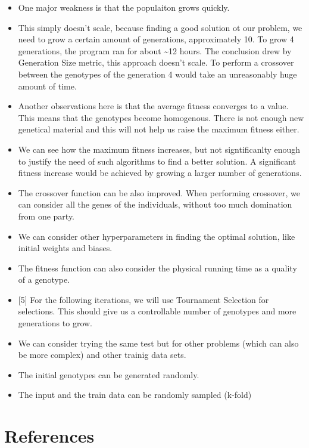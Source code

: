 \documentclass[11pt]{article}
\begin{document}
\begin{itemize}
\item
  One major weakness is that the populaiton grows quickly.
\item
  This simply doesn't scale, because finding a good solution ot our
  problem, we need to grow a certain amount of generations,
  approximately 10. To grow 4 generations, the program ran for about
  \textasciitilde{}12 hours. The conclusion drew by Generation Size
  metric, this approach doesn't scale. To perform a crossover between
  the genotypes of the generation 4 would take an unreasonably huge
  amount of time.
\item
  Another observations here is that the average fitness converges to a
  value. This means that the genotypes become homogenous. There is not
  enough new genetical material and this will not help us raise the
  maximum fitness either.
\item
  We can see how the maximum fitness increases, but not signtificanlty
  enough to justify the need of such algorithms to find a better
  solution. A significant fitness increase would be achieved by growing
  a larger number of generations.
\item
  The crossover function can be also improved. When performing
  crossover, we can consider all the genes of the individuals, without
  too much domination from one party.
\item
  We can consider other hyperparameters in finding the optimal solution,
  like initial weights and biases.
\item
  The fitness function can also consider the physical running time as a
  quality of a genotype.
\item
  {[}5{]} For the following iterations, we will use Tournament Selection
  for selections. This should give us a controllable number of genotypes
  and more generations to grow.
\item
  We can consider trying the same test but for other problems (which can
  also be more complex) and other trainig data sets.
\item
  The initial genotypes can be generated randomly.
\item
  The input and the train data can be randomly sampled (k-fold)
\end{itemize}

    \hypertarget{references}{%
\section{References}\label{references}}
\end{document}
